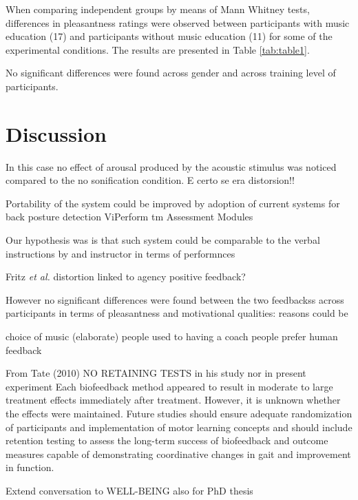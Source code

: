 \documentclass[10pt,letterpaper]{article}
\begin{document}
When comparing independent groups by means of Mann Whitney tests, differences in pleasantness ratings were observed between participants with music education (17) and participants without music education (11) for some of the experimental conditions.
The results are presented in Table \ref{tab:table1}.



No significant differences were found across gender and across training level of participants. 

\section*{Discussion} \label{sec:discussion}

In this case no effect of arousal produced by the acoustic stimulus was noticed compared to the no sonification condition. E certo se era distorsion!!




Portability of the system could be improved by adoption of current systems for back posture detection ViPerform tm Assessment Modules


Our hypothesis was is that such system could be comparable to the verbal instructions by and instructor in terms of performnces 

Fritz \emph{et al.}  \cite{fritz2013musical}  distortion linked to agency positive feedback?


However no significant differences were found between the two feedbackss across participants in terms of pleasantness and motivational qualities: reasons could be

choice of music (elaborate)
people used to having a coach
people prefer human feedback

From Tate (2010) NO RETAINING TESTS in his study nor in present experiment
 Each biofeedback method appeared to result in moderate to large treatment effects immediately after treatment. However, it is unknown whether the effects were maintained. Future studies should ensure adequate randomization of participants and implementation of motor learning concepts and should include retention testing to assess the long-term success of biofeedback and outcome measures capable of demonstrating coordinative changes in gait and improvement in function.

Extend conversation to WELL-BEING also for PhD thesis
\end{document}
